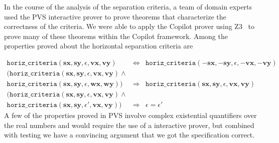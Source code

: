 In the course of the analysis of the separation criteria, a team of
domain experts used the PVS interactive prover to prove theorems that
characterize the correctness of the criteria.  We were able to apply
the Copilot prover using Z3~\cite{DeMoura2008} to prove many of these theorems
within the Copilot framework. Among the properties proved about the
horizontal separation criteria are

\begin{eqnarray*}
\texttt{horiz\_criteria}(\bm{sx},  \bm{sy},
\epsilon,  \bm{vx},  \bm{vy}) & \Longleftrightarrow &
\texttt{horiz\_criteria}(\bm{-sx},  \bm{-sy},
\epsilon, \bm{-vx},  \bm{-vy})   \\
( \texttt{horiz\_criteria}(\bm{sx},\bm{sy},
\epsilon, \bm{vx},\bm{vy})  \wedge &&  \\ 
\texttt{horiz\_criteria} (\bm{sx},  \bm{sy},
\epsilon,  \bm{wx}, \bm{wy}) )& \Longrightarrow&
\texttt{horiz\_criteria} (\bm{sx}, \bm{sy},
\epsilon,\bm{vx},\bm{vy})\\
( \texttt{horiz\_criteria}(\bm{sx},  \bm{sy},
\epsilon,  \bm{vx},  \bm{vy})  \wedge  &&\\
\texttt{horiz\_criteria}(\bm{sx},  \bm{sy},
\epsilon',  \bm{vx},  \bm{vy}) )  &\Longrightarrow & \epsilon = \epsilon'
\end{eqnarray*}
A few of the properties proved in PVS  involve complex existential quantifiers over
the real numbers and would require the use of a interactive prover,
but combined with testing we have a convincing argument that we got the
specification correct. 


%
%




